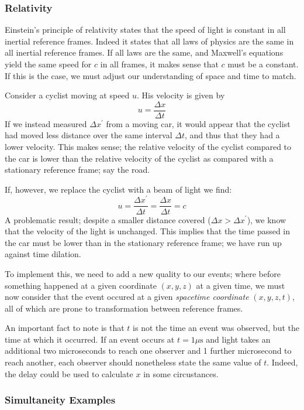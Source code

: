 \documentclass[12pt]{report}
\begin{document}
\begin{flushleft}
\subsubsection*{Relativity}
Einstein's principle of relativity states that the speed of light is constant
in all inertial reference frames. Indeed it states that all laws of physics are
the same in all inertial reference frames. If all laws are the same, and 
Maxwell's equations yield the same speed for \(c\) in all frames, it makes 
sense that \(c\) must be a constant. If this is the case, we must adjust our
understanding of space and time to match.

\bigskip
Consider a cyclist moving at speed \(u\). His velocity is given by
\[u = \frac{\Delta x}{\Delta t}\]
If we instead measured \(\Delta x^\prime\) from a moving car, it would appear
that the cyclist had moved less distance over the same interval \(\Delta t\),
and thus that they had a lower velocity. This makes sense; the relative 
velocity of the cyclist compared to the car is lower than the relative velocity
of the cyclist as compared with a stationary reference frame; say the road.

\bigskip
If, however, we replace the cyclist with a beam of light we find:
\[u = \frac{\Delta x^\prime}{\Delta t} = \frac{\Delta x}{\Delta t} = c\]
A problematic result; despite a smaller distance covered 
(\(\Delta x > \Delta x^\prime\)), we know that the velocity of the light 
is unchanged. This implies that the time passed in the car must be lower
than in the stationary reference frame; we have run up against time dilation.

\bigskip
To implement this, we need to add a new quality to our events; where before 
something happened at a given coordinate \((x, y, z)\) at a given time, we must
now consider that the event occured at a given \textit{spacetime coordinate}
\((x, y, z, t)\), all of which are prone to transformation between reference
frames.

\bigskip
An important fact to note is that \(t\) is not the time an event was observed,
but the time at which it occurred. If an event occurs at \(t = 1\mu\mathrm{s}\)
and light takes an additional two microseconds to reach one observer and 1 
further microsecond to reach another, each observer should nonetheless state
the same value of \(t\). Indeed, the delay could be used to calculate \(x\) in
some circustances.

\subsubsection*{Simultaneity Examples}


\end{flushleft}
\end{document}
